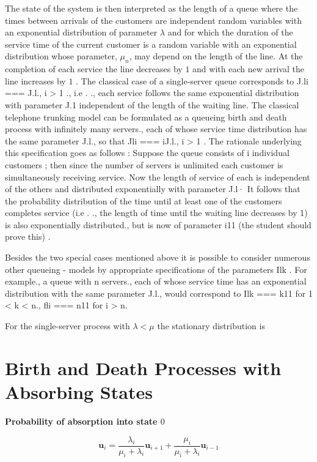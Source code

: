 \documentclass[12pt]{article}
\theoremstyle{nonumberbreak}
\begin{document}
The state of the system is then interpreted as the length of a queue where the times between arrivals of the customers are independent random variables with an exponential distribution of parameter $\lambda$ and for which the duration of the service time of the current customer is a random variable with an exponential distribution whose parameter, $\mu_n$, may depend on the length of the line. At the completion of each service the line decreases by $1$ and with each new arrival the line increases by $1$ . The
classical case of a single-server queue corresponds to J.li === J.l., i > 1 ., i.e . .,
each service follows the same exponential distribution with parameter J.1 independent of the length of the waiting line.
The classical telephone trunking model can be formulated as a queueing
birth and death process with infinitely many servers., each of whose service
time distribution has the same parameter J.l., so that Jli === iJ.l., i > 1 . The
rationale underlying this specification goes as follows : Suppose the queue
consists of i individual customers ; then since the number of servers is
unlimited each customer is simultaneously receiving service. Now the
length of service of each is independent of the others and distributed
exponentially with parameter J.l· It follows that the probability distribution
of the time until at least one of the customers completes service
(i.e . ., the length of time until the waiting line decreases by 1) is also exponentially
distributed., but is now of parameter i11 (the student should
prove this) .

Besides the two special cases mentioned above it is possible to consider
numerous other queueing - models by appropriate specifications of the
parameters Ilk . For example., a queue with n servers., each of whose service
time has an exponential distribution with the same parameter J.l., would
correspond to Ilk === k11 for 1 < k < n., fli === n11 for i > n.


For the single-server process with $\lambda < \mu$ the stationary distribution is 


\section{Birth and Death Processes with Absorbing States}

\textbf{Probability of absorption into state $0$}


$$
\mathbf{u}_i = \frac{\lambda_i}{\mu_i + \lambda_i} \mathbf{u}_{i+1}  + \frac{\mu_i}{\mu_i + \lambda_i} \mathbf{u}_{i-1}
$$
\end{document}
